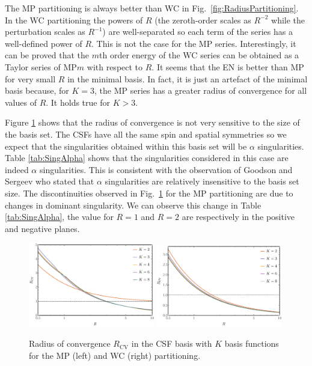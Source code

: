 \documentclass[11pt,a4paper]{article}
\begin{document}
The MP partitioning is always better than WC in Fig.~\ref{fig:RadiusPartitioning}. In the WC partitioning the powers of $R$ (the zeroth-order scales as $R^{-2}$ while the perturbation scales as $R^{-1}$) are well-separated so each term of the series has a well-defined power of $R$. This is not the case for the MP series.
Interestingly, it can be proved that the $m$th order energy of the WC series can be obtained as a Taylor series of MP$m$ with respect to $R$. 
It seems that the EN is better than MP for very small $R$ in the minimal basis. In fact, it is just an artefact of the minimal basis because, for $K = 3$, the MP series has a greater radius of convergence for all values of $R$. It holds true for $K>3$.


Figure \ref{fig:RadiusBasis} shows that the radius of convergence is not very sensitive to the size of the basis set. The CSFs have all the same spin and spatial symmetries so we expect that the singularities obtained within this basis set will be $\alpha$ singularities. Table \ref{tab:SingAlpha} shows that the singularities considered in this case are indeed $\alpha$ singularities. This is consistent with the observation of Goodson and Sergeev \cite{Goodson_2004} who stated that $\alpha$ singularities are relatively insensitive to the basis set size. The discontinuities observed in Fig.~\ref{fig:RadiusBasis} for the MP partitioning are due to changes in dominant singularity. We can observe this change in Table \ref{tab:SingAlpha}, the value for $R=1$ and $R=2$ are respectively in the positive and negative planes.

\begin{figure}[h!]
    \centering
    \includegraphics[width=0.49\textwidth]{MPlargebasis.pdf}
    \includegraphics[width=0.49\textwidth]{WCElargebasis.pdf}
    \caption{Radius of convergence $R_{\text{CV}}$ in the CSF basis with $K$ basis functions for the MP (left) and WC (right) partitioning.}
    \label{fig:RadiusBasis}
\end{figure}
\end{document}
